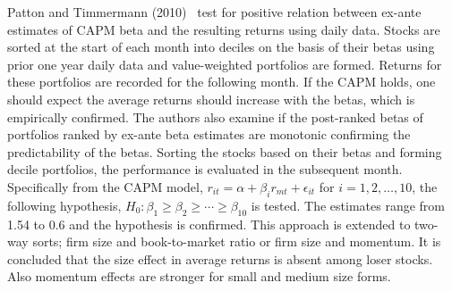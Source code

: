 Patton and Timmermann (2010)~\cite{pattim} test for positive relation between ex-ante estimates of CAPM beta and the resulting returns using daily data. Stocks are sorted at the start of each month into deciles on the basis of their betas using prior one year daily data and value-weighted portfolios are formed. Returns for these portfolios are recorded for the following month. If the CAPM holds, one should expect the average returns should increase with the betas, which is empirically confirmed. The authors also examine if the post-ranked betas of portfolios ranked by ex-ante beta estimates are monotonic confirming the predictability of the betas. Sorting the stocks based on their betas and forming decile portfolios, the performance is evaluated in the subsequent month. Specifically from the CAPM model, $r_{it}= \alpha + \beta_i r_{mt} + \epsilon_{it}$ for $i=1,2,\ldots,10$, the following hypothesis, $H_0: \beta_1 \geq \beta_2 \geq \cdots \geq \beta_{10}$ is tested. The estimates range from 1.54 to 0.6 and the hypothesis is confirmed. This approach is extended to two-way sorts; firm size and book-to-market ratio or firm size and momentum. It is concluded that the size effect in average returns is absent among loser stocks. Also momentum effects are stronger for small and medium size forms. \\


